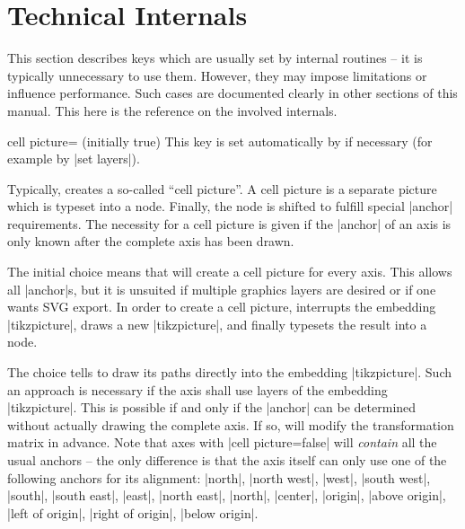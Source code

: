 
\section{Technical Internals}

{

This section describes keys which are usually set by internal routines -- it is
typically unnecessary to use them. However, they may impose limitations or
influence performance. Such cases are documented clearly in other sections of
this manual. This here is the reference on the involved internals.

\begin{pgfplotskey}{cell picture= (initially true)}
    This key is set automatically by \PGFPlots{} if necessary (for example by
    |set layers|).

    Typically, \PGFPlots{} creates a so-called ``cell picture''. A cell picture
    is a separate picture which is typeset into a node. Finally, the node is
    shifted to fulfill special |anchor| requirements. The necessity for a cell
    picture is given if the |anchor| of an axis is only known after the
    complete axis has been drawn.

    The initial choice  means that \PGFPlots{} will create a
    cell picture for every axis. This allows all |anchor|s, but it is unsuited
    if multiple graphics layers are desired or if one wants SVG export. In
    order to create a cell picture, \PGFPlots{} interrupts the embedding
    |tikzpicture|, draws a new |tikzpicture|, and finally typesets the result
    into a node.

    The choice  tells \PGFPlots{} to draw its paths directly
    into the embedding |tikzpicture|. Such an approach is necessary if the axis
    shall use layers of the embedding |tikzpicture|. This is possible if and
    only if the |anchor| can be determined without actually drawing the
    complete axis. If so, \PGFPlots{} will modify the transformation matrix in
    advance. Note that axes with |cell picture=false| will \emph{contain} all
    the usual anchors -- the only difference is that the axis itself can only
    use one of the following anchors for its alignment: |north|, |north west|,
    |west|, |south west|, |south|, |south east|, |east|, |north east|, |north|,
    |center|, |origin|, |above origin|, |left of origin|, |right of origin|,
    |below origin|.


\end{pgfplotskey}}
